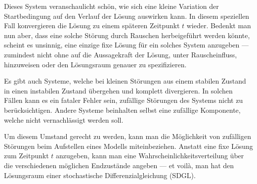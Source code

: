 Dieses System veranschaulicht schön, wie sich eine kleine Variation der Startbedingung auf den Verlauf der Lösung auswirken kann. In diesem speziellen Fall konvergieren die Lösung zu einem späteren Zeitpunkt $ t $ wieder. Bedenkt man nun aber, dass eine solche Störung durch Rauschen herbeigeführt werden könnte, scheint es unsinnig, eine einzige fixe Lösung für ein solches System anzugeben --- zumindest nicht ohne auf die Aussagekraft der Lösung, unter Rauscheinfluss, hinzuweisen oder den Lösungsraum genauer zu spezifizieren.

Es gibt auch Systeme, welche bei kleinen Störungen aus einem stabilen Zustand in einen instabilen Zustand übergehen und komplett divergieren. In solchen Fällen kann es ein fataler Fehler sein, zufällige Störungen des Systems nicht zu berücksichtigen. Andere Systeme beinhalten selbst eine zufällige Komponente, welche nicht vernachlässigt werden soll.

Um diesem Umstand gerecht zu werden, kann man die Möglichkeit von zufälligen Störungen beim Aufstellen eines Modells miteinbeziehen. Anstatt eine fixe Lösung zum Zeitpunkt $ t $ anzugeben, kann man eine Wahrscheinlichkeitsverteilung über die verschiedenen möglichen Endzustände angeben --- et voilà, man hat den Lösungsraum einer stochastische Differenzialgleichung (SDGL).
